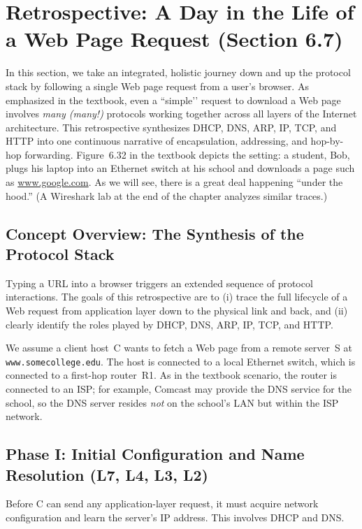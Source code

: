 \documentclass[12pt]{article}
\begin{document}
\section{Retrospective: A Day in the Life of a Web Page Request (Section 6.7)}
\label{sec:day-in-life}

In this section, we take an integrated, holistic journey down and up the protocol stack by following a single Web page request from a user's browser. As emphasized in the textbook, even a ``simple’’ request to download a Web page involves \emph{many (many!)} protocols working together across all layers of the Internet architecture. This retrospective synthesizes DHCP, DNS, ARP, IP, TCP, and HTTP into one continuous narrative of encapsulation, addressing, and hop-by-hop forwarding. Figure~6.32 in the textbook depicts the setting: a student, Bob, plugs his laptop into an Ethernet switch at his school and downloads a page such as \url{www.google.com}. As we will see, there is a great deal happening ``under the hood.'' (A Wireshark lab at the end of the chapter analyzes similar traces.)

\subsection{Concept Overview: The Synthesis of the Protocol Stack}

Typing a URL into a browser triggers an extended sequence of protocol interactions. The goals of this retrospective are to (i) trace the full lifecycle of a Web request from application layer down to the physical link and back, and (ii) clearly identify the roles played by DHCP, DNS, ARP, IP, TCP, and HTTP.

We assume a client host~C wants to fetch a Web page from a remote server~S at \texttt{www.somecollege.edu}. The host is connected to a local Ethernet switch, which is connected to a first-hop router~R1. As in the textbook scenario, the router is connected to an ISP; for example, Comcast may provide the DNS service for the school, so the DNS server resides \emph{not} on the school's LAN but within the ISP network.

\subsection{Phase I: Initial Configuration and Name Resolution (L7, L4, L3, L2)}

Before C can send any application-layer request, it must acquire network configuration and learn the server's IP address. This involves DHCP and DNS.
\end{document}
